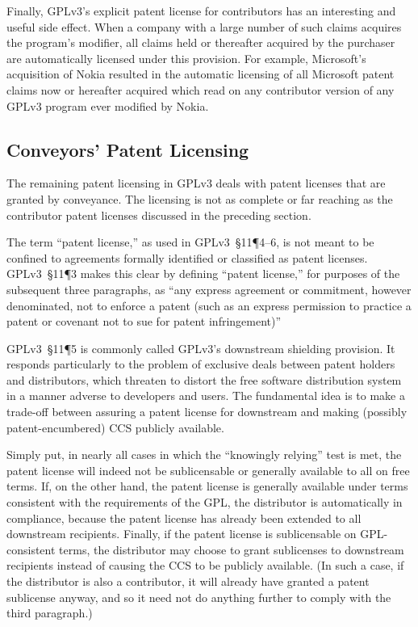 Finally, GPLv3's explicit patent license for contributors has an interesting
and useful side effect.  When a company with a large number of such claims
acquires the program's modifier, all claims held or thereafter acquired by
the purchaser are automatically licensed under this provision.  For example,
Microsoft's acquisition of Nokia resulted in the automatic licensing of all
Microsoft patent claims now or hereafter acquired which read on any
contributor version of any GPLv3 program ever modified by Nokia.

\subsection{Conveyors' Patent Licensing}

The remaining patent licensing in GPLv3 deals with patent licenses that are
granted by conveyance.  The licensing is not as complete or far reaching as
the contributor patent licenses discussed in the preceding section.

The term ``patent license,'' as used in GPLv3~\S11\P4--6, is not meant to be
confined to agreements formally identified or classified as patent licenses.
GPLv3~\S11\P3  makes this clear by defining ``patent
license,'' for purposes of the subsequent three paragraphs, as ``any express
agreement or commitment, however denominated, not to enforce a patent
(such as an express permission to practice a patent or covenant not to
sue for patent infringement)''



GPLv3~\S11\P5 is commonly called GPLv3's downstream shielding provision.  It
responds particularly to the problem of exclusive deals between patent
holders and distributors, which threaten to distort the free software
distribution system in a manner adverse to developers and users.  The
fundamental idea is to make a trade-off between assuring a patent license for
downstream and making  (possibly patent-encumbered) CCS publicly available.

Simply put, in nearly all cases in which the ``knowingly relying'' test is
met, the patent license will indeed not be sublicensable or generally
available to all on free terms.  If, on the other hand, the patent license is
generally available under terms consistent with the requirements of the GPL,
the distributor is automatically in compliance, because the patent license
has already been extended to all downstream recipients.  Finally, if the
patent license is sublicensable on GPL-consistent terms, the distributor may
choose to grant sublicenses to downstream recipients instead of causing the
CCS to be publicly available.  (In such a case, if the distributor is also a
contributor, it will already have granted a patent sublicense anyway, and so
it need not do anything further to comply with the third paragraph.)

